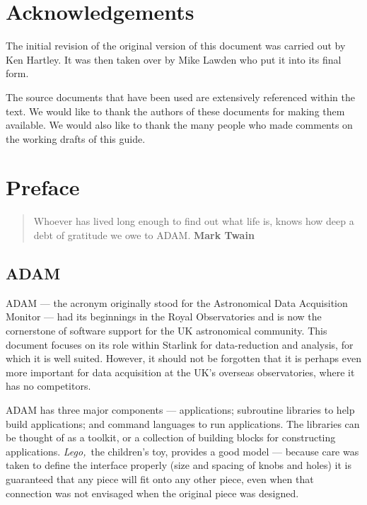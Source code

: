 \chapter*{Acknowledgements}

The initial revision of the original version of this document was carried out
by Ken Hartley.
It was then taken over by Mike Lawden who put it into its final form.

The source documents that have been used are extensively referenced within
the text.
We would like to thank the authors of these documents for making them
available.
We would also like to thank the many people who made comments on the
working drafts of this guide.

\chapter*{Preface\label{C_pref}}

   \begin {quote} {\small {Whoever has lived long enough to find out
                  what life is, knows how deep a debt of gratitude
                  we owe to ADAM.} \hfill {\small \bf Mark Twain} }
  \end{quote}

\section*{ADAM}
\label{S_preadam}

ADAM --- the acronym originally stood for the Astronomical Data Acquisition
Monitor --- had its beginnings in the Royal Observatories and is now the
cornerstone of software support for the UK astronomical community.
This document focuses on its role within Starlink for data-reduction and
analysis, for which it is well suited.
However, it should not be forgotten that it is perhaps even more important
for data acquisition at the UK's overseas observatories, where it has no
competitors.

ADAM has three major components --- applications; subroutine libraries
to help build applications; and command languages to run applications.
The libraries can be thought of as a toolkit, or a collection of building
blocks for constructing applications.
{\em Lego,}\, the children's toy, provides a good model --- because care was
taken to define the interface properly (size and spacing of knobs and holes) it
is guaranteed that any piece will fit onto any other piece, even when that
connection was not envisaged when the original piece was designed.

